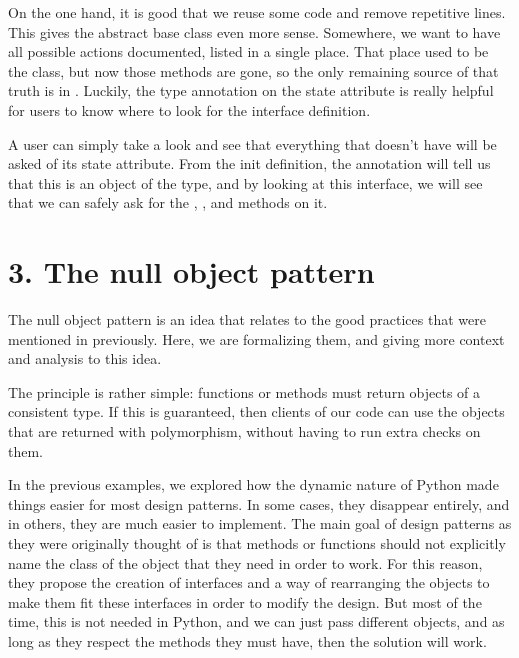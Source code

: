 \documentclass[a4paper,10pt,english]{sphinxmanual}
\begin{document}
On the one hand, it is good that we reuse some code and remove repetitive lines. This gives
the abstract base class even more sense. Somewhere, we want to have all possible actions
documented, listed in a single place. That place used to be the  class, but
now those methods are gone, so the only remaining source of that truth is
in . Luckily, the type annotation on the state attribute is really
helpful for users to know where to look for the interface definition.

A user can simply take a look and see that everything that  doesn’t have will
be asked of its state attribute. From the init definition, the annotation will tell us that
this is an object of the  type, and by looking at this interface, we will
see that we can safely ask for the , , and  methods on it.


\section{3. The null object pattern}
\label{\detokenize{chapters/9_design_patterns/index:the-null-object-pattern}}
The null object pattern is an idea that relates to the good practices that were mentioned in
previously. Here, we are formalizing them, and giving more context
and analysis to this idea.

The principle is rather simple: functions or methods must return objects of a consistent
type. If this is guaranteed, then clients of our code can use the objects that are returned with
polymorphism, without having to run extra checks on them.

In the previous examples, we explored how the dynamic nature of Python made things
easier for most design patterns. In some cases, they disappear entirely, and in others, they
are much easier to implement. The main goal of design patterns as they were originally
thought of is that methods or functions should not explicitly name the class of the object
that they need in order to work. For this reason, they propose the creation of interfaces and
a way of rearranging the objects to make them fit these interfaces in order to modify the
design. But most of the time, this is not needed in Python, and we can just pass different
objects, and as long as they respect the methods they must have, then the solution will
work.
\end{document}

